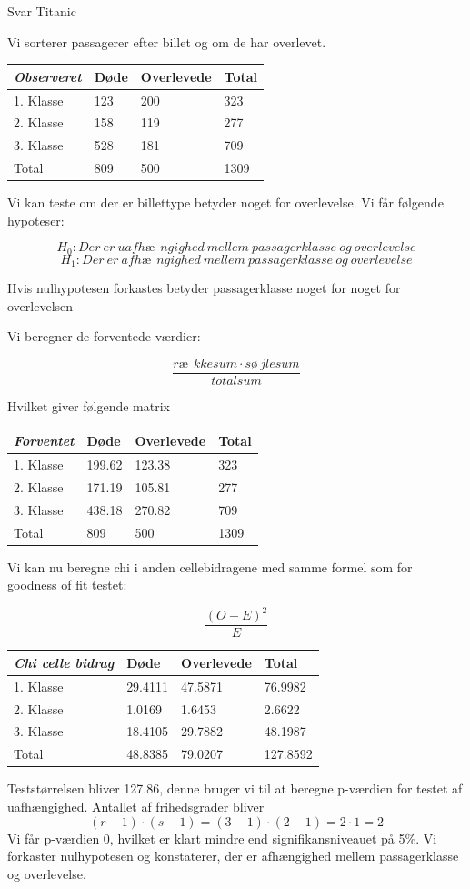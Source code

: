 \documentclass[]{book}
\begin{document}
Svar Titanic

Vi sorterer passagerer efter billet og om de har overlevet.

\begin{longtable}[]{@{}llll@{}}
\toprule
\textbf{\emph{Observeret}} & Døde & Overlevede & Total\tabularnewline
\midrule
\endhead
1. Klasse & 123 & 200 & 323\tabularnewline
2. Klasse & 158 & 119 & 277\tabularnewline
3. Klasse & 528 & 181 & 709\tabularnewline
Total & 809 & 500 & 1309\tabularnewline
\bottomrule
\end{longtable}

Vi kan teste om der er billettype betyder noget for overlevelse. Vi får følgende hypoteser:

\[H_0: Der\ er\ uafhæ\ \ ngighed\ mellem\ passagerklasse\ og\ overlevelse\]\[H_1: Der\ er\ afhæ\ \ ngighed\ mellem\ passagerklasse\ og\ overlevelse\]

Hvis nulhypotesen forkastes betyder passagerklasse noget for noget for overlevelsen

Vi beregner de forventede værdier:

\[\frac{ræ\ \ kkesum\cdot sø\ jlesum}{totalsum}\]

Hvilket giver følgende matrix

\begin{longtable}[]{@{}llll@{}}
\toprule
\textbf{\emph{Forventet}} & Døde & Overlevede & Total\tabularnewline
\midrule
\endhead
1. Klasse & 199.62 & 123.38 & 323\tabularnewline
2. Klasse & 171.19 & 105.81 & 277\tabularnewline
3. Klasse & 438.18 & 270.82 & 709\tabularnewline
Total & 809 & 500 & 1309\tabularnewline
\bottomrule
\end{longtable}

Vi kan nu beregne chi i anden cellebidragene med samme formel som for goodness of fit testet:

\[\frac{(O-E)^2}{E}\]

\begin{longtable}[]{@{}llll@{}}
\toprule
\textbf{\emph{Chi celle bidrag}} & Døde & Overlevede & Total\tabularnewline
\midrule
\endhead
1. Klasse & 29.4111 & 47.5871 & 76.9982\tabularnewline
2. Klasse & 1.0169 & 1.6453 & 2.6622\tabularnewline
3. Klasse & 18.4105 & 29.7882 & 48.1987\tabularnewline
Total & 48.8385 & 79.0207 & 127.8592\tabularnewline
\bottomrule
\end{longtable}

Teststørrelsen bliver 127.86, denne bruger vi til at beregne p-værdien for testet af uafhængighed. Antallet af frihedsgrader bliver
\[(r-1)\cdot(s-1)=(3-1)\cdot(2-1)=2\cdot 1=2\]
Vi får p-værdien 0, hvilket er klart mindre end signifikansniveauet på 5\%. Vi forkaster nulhypotesen og konstaterer, der er afhængighed mellem passagerklasse og overlevelse.
\end{document}

